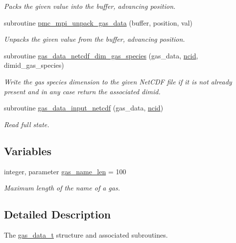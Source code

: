 \begin{DoxyCompactItemize}
\begin{DoxyCompactList}\small\item\em Packs the given value into the buffer, advancing position. \end{DoxyCompactList}\item 
subroutine \mbox{\hyperlink{namespacepmc__gas__data_af9c9ad522a84e72e20e052adad31c24d}{pmc\+\_\+mpi\+\_\+unpack\+\_\+gas\+\_\+data}} (buffer, position, val)
\begin{DoxyCompactList}\small\item\em Unpacks the given value from the buffer, advancing position. \end{DoxyCompactList}\item 
subroutine \mbox{\hyperlink{namespacepmc__gas__data_a6df4c6edda1d1134595d124321b4f308}{gas\+\_\+data\+\_\+netcdf\+\_\+dim\+\_\+gas\+\_\+species}} (gas\+\_\+data, \mbox{\hyperlink{fractal_8_f90_a4e89f3f850921ff84a6dfce8b166ad50}{ncid}}, dimid\+\_\+gas\+\_\+species)
\begin{DoxyCompactList}\small\item\em Write the gas species dimension to the given Net\+C\+DF file if it is not already present and in any case return the associated dimid. \end{DoxyCompactList}\item 
subroutine \mbox{\hyperlink{namespacepmc__gas__data_a1777fe2ed855a4b26c45287e166a0940}{gas\+\_\+data\+\_\+input\+\_\+netcdf}} (gas\+\_\+data, \mbox{\hyperlink{fractal_8_f90_a4e89f3f850921ff84a6dfce8b166ad50}{ncid}})
\begin{DoxyCompactList}\small\item\em Read full state. \end{DoxyCompactList}\end{DoxyCompactItemize}
\subsection*{Variables}
\begin{DoxyCompactItemize}
\item 
integer, parameter \mbox{\hyperlink{namespacepmc__gas__data_a0d310b1185398e90f841bb9c3c83d3a9}{gas\+\_\+name\+\_\+len}} = 100
\begin{DoxyCompactList}\small\item\em Maximum length of the name of a gas. \end{DoxyCompactList}\end{DoxyCompactItemize}


\subsection{Detailed Description}
The \mbox{\hyperlink{structpmc__gas__data_1_1gas__data__t}{gas\+\_\+data\+\_\+t}} structure and associated subroutines. 

